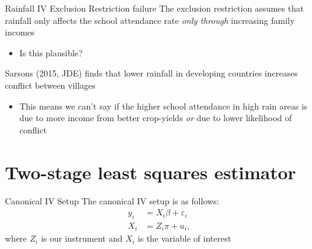 \documentclass[aspectratio=169,t,11pt,table]{beamer}
\begin{document}
\begin{frame}{Rainfall IV Exclusion Restriction failure}
  The exclusion restriction assumes that rainfall only affects the school attendance rate \emph{only through} increasing family incomes
  \begin{itemize}
    \item Is this plausible?
  \end{itemize}

  \pause
  \bigskip
  Sarsons (2015, JDE) finds that lower rainfall in developing countries increases conflict between villages
  \begin{itemize}
    \item This means we can't say if the higher school attendance in high rain areas is due to more income from better crop-yields \emph{or} due to lower likelihood of conflict
  \end{itemize}
\end{frame}

\section{Two-stage least squares estimator}

\begin{frame}{Canonical IV Setup}
  The canonical IV setup is as follows:
  \begin{align*}
    y_i &= X_i \beta + \varepsilon_i \\
    X_i &= Z_i \pi + u_i,
  \end{align*}
  where $Z_i$ is our instrument and $X_i$ is the variable of interest

\end{frame}
\end{document}
